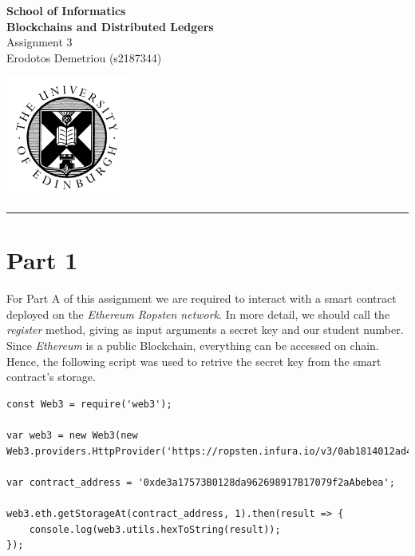 \documentclass[12pt,a4paper]{article}
\begin{document}
\noindent
\begin{minipage}{120mm}
        {\huge {\bf School of Informatics}}\\
        {\Large {\bf Blockchains and Distributed Ledgers}}\\

        {\Large Assignment 3}\\
        {\normalsize Erodotos Demetriou (s2187344)}
\end{minipage}
\hfill
\begin{minipage}{40mm}              
        \includegraphics[width=40mm]{crest.png}
\end{minipage}

\begin{center}
\rule{\linewidth}{0.5mm}
\end{center}

\section*{Part 1}

For Part A of this assignment we are required to interact with a smart contract
deployed on the \emph{Ethereum Ropsten network}. In more detail, we should call
the \emph{register} method, giving as input arguments a secret key and our student
number. Since \emph{Ethereum} is a public Blockchain, everything can be accessed
on chain. Hence, the following script was used to retrive the secret key from
the smart contract's storage. \\

\begin{lstlisting}
const Web3 = require('web3');

var web3 = new Web3(new Web3.providers.HttpProvider('https://ropsten.infura.io/v3/0ab1814012ad4231965d67bf98a40b1a'));

var contract_address = '0xde3a17573B0128da962698917B17079f2aAbebea';

web3.eth.getStorageAt(contract_address, 1).then(result => {
    console.log(web3.utils.hexToString(result));
});
\end{lstlisting} 
\end{document}
